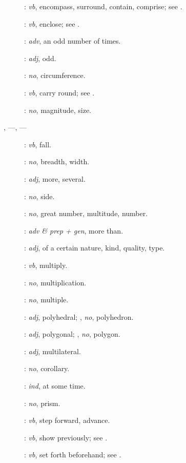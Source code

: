 {\begin{description}
\item[]: {\em vb},
encompass, surround, contain, comprise; see .
\item[]: {\em vb}, enclose; see .
\item[]: {\em adv}, an odd number of times.
\item[]: {\em adj}, odd.
\item[]: {\em no}, circumference.
\item[]: {\em vb}, carry round; see .
\item[]: {\em no}, magnitude, size.
\item[, ---, ---]: {\em vb}, fall.
\item[]: {\em no}, breadth, width.
\item[]: {\em adj}, more, several.
\item[]: {\em no}, side.
\item[]: {\em no}, great number, multitude, number.
\item[]: {\em adv \& prep + gen}, more than.
\item[]: {\em adj}, of a certain nature, kind, quality, type.
\item[]: {\em vb}, multiply.
\item[]: {\em no}, multiplication.
\item[]: {\em no}, multiple.
\item[]: {\em adj}, polyhedral; , {\em no}, polyhedron.
\item[]: {\em adj}, polygonal; , {\em no}, polygon.
\item[]: {\em adj}, multilateral.
\item[]: {\em no}, corollary.
\item[]: {\em ind}, at some time.
\item[]: {\em no}, prism.
\item[]: {\em vb}, step forward, advance.
\item[]: {\em vb}, show
previously; see .
\item[]: {\em vb}, set forth beforehand; see .

\end{description}}
